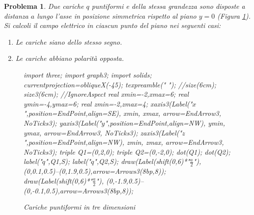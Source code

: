 \documentclass[a4paper,oneside]{article}
\newtheorem{problema}{Problema}
\let\oldhat\hat
\renewcommand{\vec}[1]{\mathbf{#1}}
\renewcommand{\hat}[1]{\widehat{\mathbf{#1}}}
\begin{document}
\begin{problema}
	Due cariche $q$ puntiformi e della stessa grandezza
	sono disposte a distanza $a$ lungo l'asse in
	posizione simmetrica rispetto al piano $y = 0$
	(Figura \ref{fig:dipolo_3d}).
	Si calcoli il campo elettrico in ciascun punto del
	piano nei seguenti casi:
	\begin{enumerate}%
		\item Le cariche siano dello stesso segno.
		\item Le cariche abbiano polarità opposta.
	\end{enumerate}
	\begin{figure}[H]
			\centering
			\begin{asy}[height=6cm,inline=true,attach=false,viewportwidth=\linewidth]
				import three;
				import graph3;
				import solids;
				currentprojection=obliqueX(-45);
				texpreamble("\let\oldhat\hat
				\renewcommand{\vec}[1]{\mathbf{#1}}
				\renewcommand{\hat}[1]{\oldhat{\mathbf{#1}}}");
				//size(6cm);
				size3(6cm);		//IgnoreAspect
				real xmin=-2,xmax=6;
				real ymin=-4,ymax=6;
				real zmin=-2,zmax=4;
				xaxis3(Label("\small $x$",position=EndPoint,align=SE),
				xmin, xmax, arrow=EndArrow3, NoTicks3);
				yaxis3(Label("\small $y$",position=EndPoint,align=NW),
				ymin, ymax, arrow=EndArrow3, NoTicks3);
				zaxis3(Label("\small $z$",position=EndPoint,align=NW),
				zmin, zmax, arrow=EndArrow3, NoTicks3);
				triple Q1=(0,2,0);
				triple Q2=(0,-2,0);			
				dot(Q1);
				dot(Q2);
				label("\small $q$",Q1,S);
				label("\small $q$",Q2,S);
				draw(Label(shift(0,6)*"\small $\frac{a}{2}$"),
				(0,0.1,0.5)--(0,1.9,0.5),arrow=Arrows3(8bp,8));
				draw(Label(shift(0,6)*"\small $\frac{a}{2}$"),
				(0,-1.9,0.5)--(0,-0.1,0.5),arrow=Arrows3(8bp,8));
			\end{asy}
			\caption{Cariche puntiformi in tre dimensioni}
			\label{fig:dipolo_3d}
		\end{figure}
\end{problema}
\end{document}
